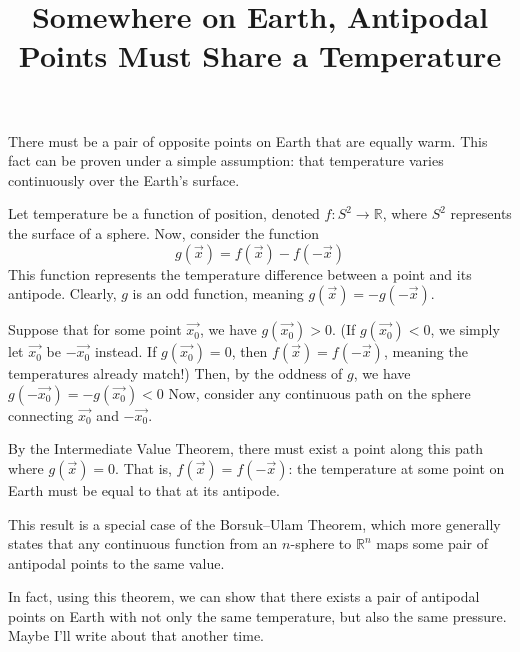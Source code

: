 \documentclass[letterpaper, 12pt]{article}
\title{Somewhere on Earth, Antipodal Points Must Share a Temperature}
\date{}
\theoremstyle{custom}
\begin{document}
\maketitle
There must be a pair of opposite points on Earth that are equally warm.
This fact can be proven under a simple assumption: that temperature varies continuously over the Earth's surface.

Let temperature be a function of position, denoted $f:S^2 \rightarrow \mathbb{R}$, where $S^2$ represents the surface of a sphere.
Now, consider the function
\begin{equation*}
  g(\vec{x}) = f(\vec{x}) - f(-\vec{x})
\end{equation*}
This function represents the temperature difference between a point and its antipode.
Clearly, $g$ is an odd function, meaning $g(\vec{x}) = -g(-\vec{x})$.

Suppose that for some point $\vec{x_0}$, we have $g(\vec{x_0}) > 0$. 
(If $g(\vec{x_0}) < 0$, we simply let $\vec{x_0}$ be $-\vec{x_0}$ instead. 
If $g(\vec{x_0}) = 0$, then $f(\vec{x}) = f(-\vec{x})$, meaning the temperatures already match!)
Then, by the oddness of $g$, we have $g(-\vec{x_0}) = -g(\vec{x_0})< 0$
Now, consider any continuous path on the sphere connecting $\vec{x_0}$ and $-\vec{x_0}$.

By the Intermediate Value Theorem, there must exist a point along this path where $g(\vec{x})=0$.
That is, $f(\vec{x}) = f(-\vec{x})$: the temperature at some point on Earth must be equal to that at its antipode.

This result is a special case of the Borsuk--Ulam Theorem, which more generally states that any continuous function from an
$n$-sphere to $\mathbb{R}^n$ maps some pair of antipodal points to the same value.

In fact, using this theorem, we can show that there exists a pair of antipodal points on Earth with not only the same temperature, but also the same pressure.
Maybe I'll write about that another time.
\end{document}
